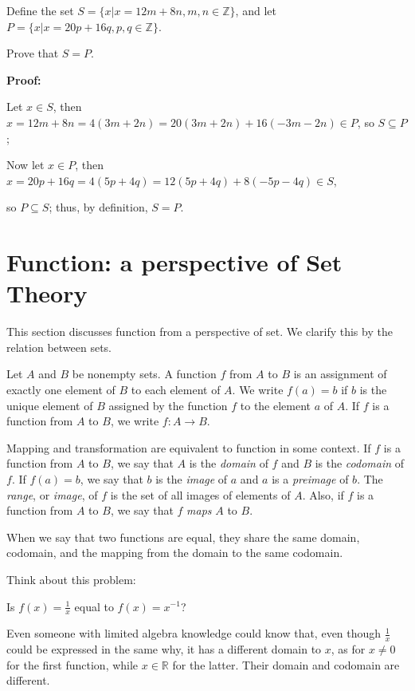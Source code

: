 \documentclass[
	12pt, %
	fleqn, %
	a4paper, %
]{LegrandOrangeBook}
\begin{document}
\begin{exercise}
    Define the set $S = \{x | x = 12m + 8n, m,n \in \mathbb{Z}\}$, and let $P = \{x | x = 20p + 16q, p,q \in \mathbb{Z}\}$.

Prove that $S = P$.
\end{exercise}
\textbf{Proof:}

Let $x \in S$, then $x = 12m + 8n = 4(3m + 2n) = 20(3m + 2n) + 16(-3m - 2n) \in P$, so $S \subseteq P$;

Now let $x \in P$, then $x = 20p + 16q = 4(5p + 4q) = 12(5p + 4q) + 8(-5p - 4q) \in S$,

so $P \subseteq S$; thus, by definition, $S = P$.
\section{Function: a perspective of Set Theory}
This section discusses function from a perspective of set. We clarify this by the relation between sets.
\begin{definition}[Function]

Let \( A \) and \( B \) be nonempty sets. A function \( f \) from \( A \) to \( B \) is an assignment of exactly one element of \( B \) to each element of \( A \). We write \( f(a) = b \) if \( b \) is the unique element of \( B \) assigned by the function \( f \) to the element \( a \) of \( A \). If \( f \) is a function from \( A \) to \( B \), we write \( f : A \rightarrow B \).
    
\end{definition}
\begin{remark}
    Mapping and transformation are equivalent to function in some context. If \( f \) is a function from \( A \) to \( B \), we say that \( A \) is the \emph{domain} of \( f \) and \( B \) is the \emph{codomain} of \( f \). If \( f(a) = b \), we say that \( b \) is the \emph{image} of \( a \) and \( a \) is a \emph{preimage} of \( b \). The \emph{range}, or \emph{image}, of \( f \) is the set of all images of elements of \( A \). Also, if \( f \) is a function from \( A \) to \( B \), we say that \( f \) \emph{maps} \( A \) to \( B \).
\end{remark}

When we say that two functions are equal, they share the same domain, codomain, and the mapping from the domain to the same codomain.

Think about this problem:
\begin{problem}
    Is $f(x) = \frac{1}{x}$ equal to $f(x) = x^{-1} $?
\end{problem}
Even someone with limited algebra knowledge could know that, even though $\frac{1} {x}$ could be expressed in the same why, it has a different domain to $x$, as for $x \neq 0$ for the first function, while $x\in \mathbb{R}$ for the latter. Their domain and codomain are different.
\end{document}
